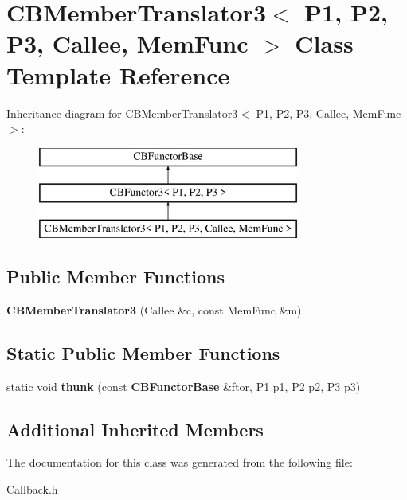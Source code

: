 \section{C\+B\+Member\+Translator3$<$ P1, P2, P3, Callee, Mem\+Func $>$ Class Template Reference}
\label{classCBMemberTranslator3}
Inheritance diagram for C\+B\+Member\+Translator3$<$ P1, P2, P3, Callee, Mem\+Func $>$\+:\begin{figure}[H]
\begin{center}
\leavevmode
\includegraphics[height=3.000000cm]{classCBMemberTranslator3}
\end{center}
\end{figure}
\subsection*{Public Member Functions}
\begin{DoxyCompactItemize}
\item 
{\bfseries C\+B\+Member\+Translator3} (Callee \&c, const Mem\+Func \&m)\label{classCBMemberTranslator3_afbcd4fd12a4415a11738ff18aa4a1325}

\end{DoxyCompactItemize}
\subsection*{Static Public Member Functions}
\begin{DoxyCompactItemize}
\item 
static void {\bfseries thunk} (const {\bf C\+B\+Functor\+Base} \&ftor, P1 p1, P2 p2, P3 p3)\label{classCBMemberTranslator3_a05fe75348c3aaa930f6cc4f690c638f8}

\end{DoxyCompactItemize}
\subsection*{Additional Inherited Members}


The documentation for this class was generated from the following file\+:\begin{DoxyCompactItemize}
\item 
Callback.\+h\end{DoxyCompactItemize}
